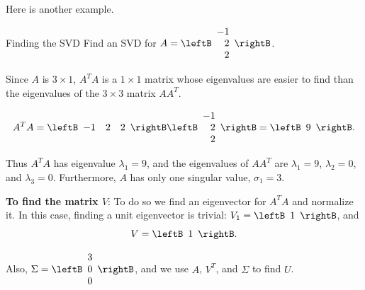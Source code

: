 Here is another example. 

\begin{example}{Finding the SVD}\label{exa:SVD2}
Find an SVD for
$A=\leftB\begin{array}{r} -1 \\ 2\\ 2 \end{array}\rightB$.
\end{example}

\begin{solution}
Since $A$ is $3\times 1$, $A^T A$ is a $1\times 1$ matrix
whose eigenvalues are easier to find than the eigenvalues of
the $3\times 3$ matrix $AA^T$.

\[ A^TA=\leftB\begin{array}{ccc} -1 & 2 & 2 \end{array}\rightB
\leftB\begin{array}{r} -1 \\ 2 \\ 2 \end{array}\rightB
=\leftB\begin{array}{r} 9 \end{array}\rightB.\]

Thus $A^TA$ has eigenvalue $\lambda_1=9$, and
the eigenvalues of $AA^T$ are $\lambda_1=9$, $\lambda_2=0$, and
$\lambda_3=0$. 
Furthermore, $A$ has only one singular value, $\sigma_1=3$.

{\bf To find the matrix $V$}:
To do so we find an eigenvector for $A^TA$ and
normalize it.
In this case, finding a unit eigenvector is trivial:
$V_1=\leftB\begin{array}{r} 1 \end{array}\rightB$, and
\[ V=\leftB\begin{array}{r} 1 \end{array}\rightB.\]

Also,
$\Sigma =\leftB\begin{array}{r} 3 \\ 0\\ 0 \end{array}\rightB$,
and we use $A$, $V^T$, and $\Sigma$ to find $U$.


\end{solution}
